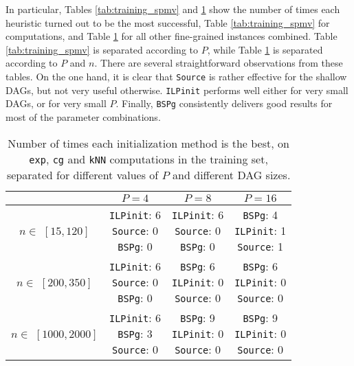 \documentclass[sigconf,nonacm]{acmart}
\begin{document}
In particular, Tables \ref{tab:training_spmv} and \ref{tab:training_rest} show the number of times each heuristic turned out to be the most successful, Table \ref{tab:training_spmv} for  computations, and Table \ref{tab:training_rest} for all other fine-grained instances combined. Table \ref{tab:training_spmv} is separated according to $P$, while Table \ref{tab:training_rest} is separated according to $P$ and $n$. There are several straightforward observations from these tables. On the one hand, it is clear that \texttt{Source} is rather effective for the shallow  DAGs, but not very useful otherwise. \texttt{ILPinit} performs well either for very small DAGs, or for very small $P$. Finally, \texttt{BSPg} consistently delivers good results for most of the parameter combinations.

\begin{table}
\centering
\caption{Number of times each initialization method is the best, on \texttt{exp}, \texttt{cg} and \texttt{kNN} computations in the training set, separated for different values of $P$ and different DAG sizes.}
\renewcommand{\arraystretch}{1.85}
\begin{tabular}{c || c | c | c|}
  & $P=4$ & $P=8$ & $P=16$ \\ [0.5ex] 
 \hline\hline
 \makecell{$n \in$ \\ $[15, 120]$} & \makecell{\texttt{ILPinit}: 6 \\ \texttt{Source}: 0 \\ \texttt{BSPg}: 0}  & \makecell{\texttt{ILPinit}: 6 \\ \texttt{Source}: 0 \\ \texttt{BSPg}: 0} & \makecell{\texttt{BSPg}: 4 \\ \texttt{ILPinit}: 1 \\ \texttt{Source}: 1} \\ 
 \hline
 \makecell{$n \in$ \\ $[200, 350]$} & \makecell{\texttt{ILPinit}: 6 \\ \texttt{Source}: 0 \\ \texttt{BSPg}: 0}  & \makecell{\texttt{BSPg}: 6 \\ \texttt{ILPinit}: 0 \\ \texttt{Source}: 0} & \makecell{\texttt{BSPg}: 6 \\ \texttt{ILPinit}: 0 \\ \texttt{Source}: 0} \\
 \hline
 \makecell{$n \in$ \\ $\!\!\![1000, 2000]\!$} & \makecell{\texttt{ILPinit}: 6 \\ \texttt{BSPg}: 3 \\ \texttt{Source}: 0} & \makecell{\texttt{BSPg}: 9 \\ \texttt{ILPinit}: 0 \\ \texttt{Source}: 0} & \makecell{\texttt{BSPg}: 9 \\ \texttt{ILPinit}: 0 \\ \texttt{Source}: 0} \\
 \hline
\end{tabular}
\label{tab:training_rest}
\end{table}
\end{document}
